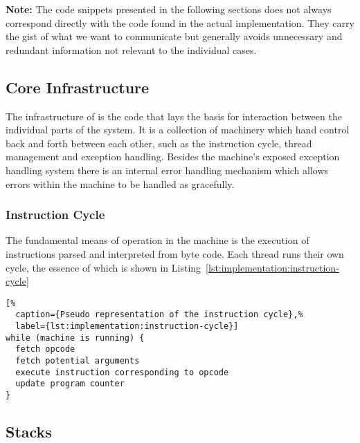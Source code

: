 \textbf{Note:} The code snippets presented in the following sections does not
always correspond directly with the code found in the actual
implementation. They carry the gist of what we want to communicate but generally
avoids unnecessary and redundant information not relevant to the individual
cases.

\subsection{Core Infrastructure}

The infrastructure of \thename{} is the code that lays the basis for interaction
between the individual parts of the system. It is a collection of machinery
which hand control back and forth between each other, such as the instruction
cycle, thread management and exception handling. Besides the machine's exposed
exception handling system there is an internal error handling mechanism which
allows errors within the machine to be handled as gracefully.

\subsubsection{Instruction Cycle}

The fundamental means of operation in the machine is the execution of
instructions parsed and interpreted from byte code. Each thread runs their own
cycle, the essence of which is shown in
Listing~\ref{lst:implementation:instruction-cycle}

\begin{lstlisting}[%
  caption={Pseudo representation of the instruction cycle},%
  label={lst:implementation:instruction-cycle}]
while (machine is running) {
  fetch opcode
  fetch potential arguments
  execute instruction corresponding to opcode
  update program counter
}
\end{lstlisting}




\subsection{Stacks}


